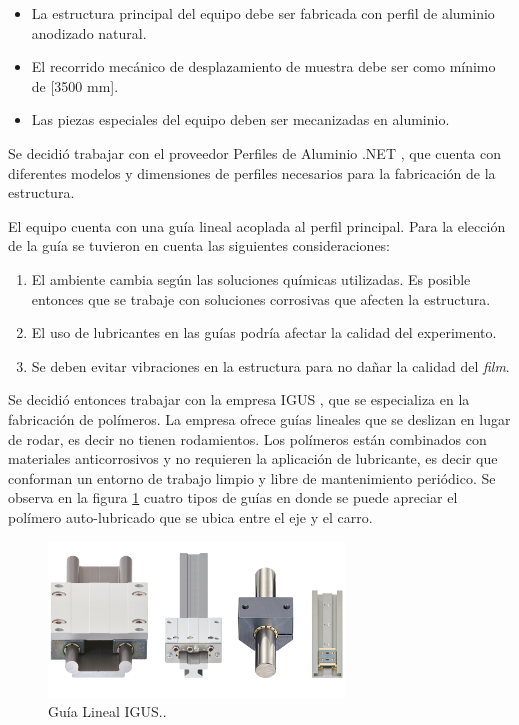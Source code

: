\begin{itemize}
\item La estructura principal del equipo debe ser fabricada con perfil de aluminio anodizado natural.
\item El recorrido mecánico de desplazamiento de muestra debe ser como mínimo de [3500 mm].
\item Las piezas especiales del equipo deben ser mecanizadas en aluminio.

\end{itemize}

Se decidió trabajar con el proveedor Perfiles de Aluminio .NET \citep{web_perfiles_net}, que cuenta con diferentes modelos y dimensiones de perfiles necesarios para la fabricación de la estructura.

El equipo cuenta con una guía lineal acoplada al perfil principal. Para la elección de la guía se tuvieron en cuenta las siguientes consideraciones:

\begin{enumerate}
\item El ambiente cambia  según las soluciones químicas utilizadas. Es posible entonces que se trabaje con soluciones corrosivas que afecten la estructura.  
\item El uso de lubricantes en las guías podría afectar la calidad del experimento.
\item Se deben evitar vibraciones en la estructura para no dañar la calidad del \textit{film}.

\end{enumerate}

Se decidió entonces trabajar con la empresa IGUS \citep{web_igus}, que se especializa en la fabricación de polímeros. La empresa ofrece guías lineales que se deslizan en lugar de rodar, es decir no tienen rodamientos. Los polímeros están combinados con materiales anticorrosivos y no requieren la aplicación de lubricante, es decir que conforman un entorno de trabajo limpio y libre de mantenimiento periódico. Se observa en la figura \ref{fig:equipo_mecánico} cuatro tipos de guías en donde se puede apreciar el polímero auto-lubricado que se ubica entre el eje y el carro.

\begin{figure}[ht]
\centering 
\includegraphics[width=0.7\textwidth]{./Figures/guias.png}
\caption{Guía Lineal IGUS.\protect\footnotemark.}
\label{fig:equipo_mecánico}
\end{figure}


